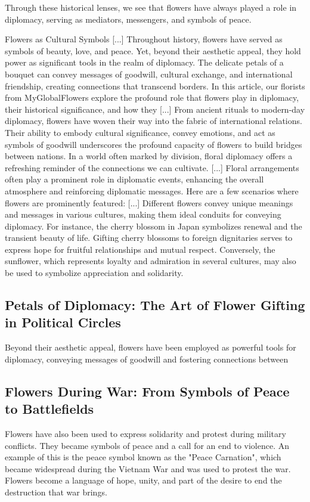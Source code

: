 \documentclass[12pt]{article}
\begin{document}
Through these historical lenses, we see that flowers have always played a role in diplomacy, serving as mediators, messengers, and symbols of peace.

Flowers as Cultural Symbols [...] Throughout history, flowers have served as symbols of beauty, love, and peace. Yet, beyond their aesthetic appeal, they hold power as significant tools in the realm of diplomacy. The delicate petals of a bouquet can convey messages of goodwill, cultural exchange, and international friendship, creating connections that transcend borders. In this article, our florists from MyGlobalFlowers explore the profound role that flowers play in diplomacy, their historical significance, and how they [...] From ancient rituals to modern-day diplomacy, flowers have woven their way into the fabric of international relations. Their ability to embody cultural significance, convey emotions, and act as symbols of goodwill underscores the profound capacity of flowers to build bridges between nations. In a world often marked by division, floral diplomacy offers a refreshing reminder of the connections we can cultivate. [...] Floral arrangements often play a prominent role in diplomatic events, enhancing the overall atmosphere and reinforcing diplomatic messages. Here are a few scenarios where flowers are prominently featured: [...] Different flowers convey unique meanings and messages in various cultures, making them ideal conduits for conveying diplomacy. For instance, the cherry blossom in Japan symbolizes renewal and the transient beauty of life. Gifting cherry blossoms to foreign dignitaries serves to express hope for fruitful relationships and mutual respect. Conversely, the sunflower, which represents loyalty and admiration in several cultures, may also be used to symbolize appreciation and solidarity.\subsection{Petals of Diplomacy: The Art of Flower Gifting in Political Circles}
Beyond their aesthetic appeal, flowers have been employed as powerful tools for diplomacy, conveying messages of goodwill and fostering connections between\subsection{Flowers During War: From Symbols of Peace to Battlefields}
Flowers have also been used to express solidarity and protest during military conflicts. They became symbols of peace and a call for an end to violence. An example of this is the peace symbol known as the "Peace Carnation", which became widespread during the Vietnam War and was used to protest the war. Flowers become a language of hope, unity, and part of the desire to end the destruction that war brings.
\end{document}
